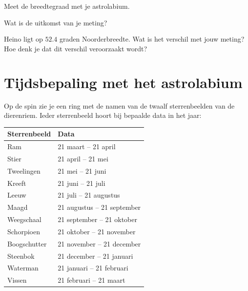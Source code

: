 \begin{opgave}
 Meet de breedtegraad met je astrolabium.
 \begin{subopgave}
  Wat is de uitkomst van je meting?
 \end{subopgave}
 \begin{subopgave}
  Heino ligt op $52.4$ graden Noorderbreedte. Wat is het verschil met jouw meting? Hoe denk je dat dit verschil veroorzaakt wordt?
 \end{subopgave}
\end{opgave}


\section{Tijdsbepaling met het astrolabium}

Op de spin zie je een ring met de namen van de twaalf sterrenbeelden van de dierenriem. Ieder sterrenbeeld hoort bij bepaalde data in het jaar:

\begin{center}
\begin{tabular}{|l|l|}
 \hline
 Sterrenbeeld & Data \\
 \hline
 Ram & 21 maart -- 21 april \\
 Stier & 21 april -- 21 mei \\
 Tweelingen & 21 mei -- 21 juni \\
 Kreeft & 21 juni -- 21 juli \\
 Leeuw & 21 juli -- 21 augustus \\
 Maagd & 21 augustus -- 21 september \\
 Weegschaal & 21 september -- 21 oktober \\
 Schorpioen & 21 oktober -- 21 november \\
 Boogschutter & 21 november -- 21 december \\
 Steenbok & 21 december -- 21 januari \\
 Waterman & 21 januari -- 21 februari \\
 Vissen & 21 februari -- 21 maart \\
 \hline
\end{tabular}
\end{center}

